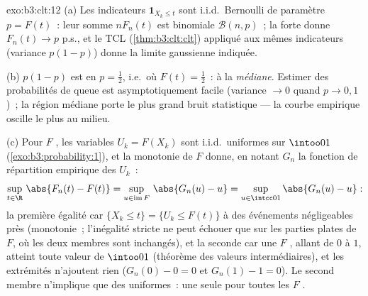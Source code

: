 \begin{solution}{exo:b3:clt:12}
(a) Les indicateurs $\mathbf 1_{X_k \leq t}$ sont i.i.d.\
Bernoulli de paramètre $p = F(t)$~: leur somme $nF_n(t)$ est
binomiale $\mathcal B(n, p)$~; la  forte donne $F_n(t)
\to p$ p.s., et le TCL (\cref{thm:b3:clt:clt}) appliqué aux
mêmes indicateurs (variance $p(1-p)$) donne la limite
gaussienne indiquée.

(b) $p(1 - p)$ est  en $p = \frac12$, i.e.\ où $F(t)
= \frac12$~: à la \emph{médiane}. Estimer des probabilités
de queue est asymptotiquement facile (variance $\to 0$
quand $p \to 0, 1$)~; la région médiane porte le plus grand
bruit statistique --- la courbe empirique oscille le plus au
milieu.

(c) Pour $F$ , les variables $U_k = F(X_k)$ sont
i.i.d.\ uniformes sur $\intoo01$
(\cref{exo:b3:probability:1}), et la monotonie de $F$
donne, en notant $G_n$ la fonction de répartition empirique
des $U_k$~:
\[
\sup_{t\in\R}\,\abs{F_n(t) - F(t)}
= \sup_{u \in \operatorname{im}F}\,\abs{G_n(u) - u}
= \sup_{u\in\intcc01}\abs{G_n(u) - u} :
\]
la première égalité car $\{X_k \leq t\} = \{U_k \leq F(t)\}$
à des événements négligeables près (monotonie~; l'inégalité
stricte ne peut échouer que sur les parties plates de $F$,
où les deux membres sont inchangés), et la seconde car une
$F$ , allant de $0$ à $1$, atteint toute valeur de
$\intoo01$ (théorème des valeurs intermédiaires), et les
extrémités n'ajoutent rien ($G_n(0) - 0 = 0$ et $G_n(1) - 1
= 0$). Le second membre n'implique que des uniformes~: une
seule  pour toutes les $F$ .
\end{solution}

